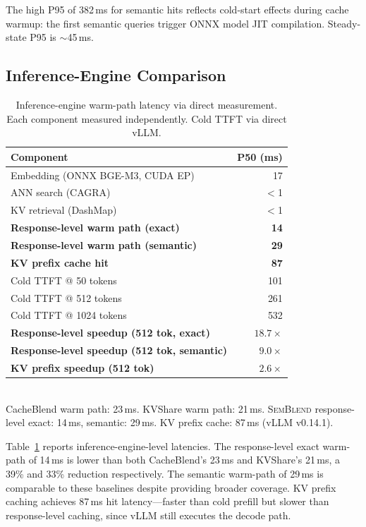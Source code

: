 \documentclass[11pt,twocolumn]{article}
\newcommand{\semblend}{\textsc{SemBlend}\xspace}
\begin{document}
The high P95 of 382\,ms for semantic hits reflects cold-start effects
during cache warmup: the first semantic queries trigger ONNX model JIT
compilation. Steady-state P95 is ${\sim}$45\,ms.


\subsection{Inference-Engine Comparison}
\label{sec:inference-comparison}

\begin{table}[t]
\centering
\caption{Inference-engine warm-path latency via direct measurement.
Each component measured independently. Cold TTFT via direct vLLM.}
\label{tab:microbench}
\footnotesize
\setlength{\tabcolsep}{3pt}
\begin{tabular}{@{}lr@{}}
\toprule
\textbf{Component} & \textbf{P50 (ms)} \\
\midrule
Embedding (ONNX BGE-M3, CUDA EP) & 17 \\
ANN search (CAGRA) & $<$1 \\
KV retrieval (DashMap) & $<$1 \\
\midrule
\textbf{Response-level warm path (exact)} & \textbf{14} \\
\textbf{Response-level warm path (semantic)} & \textbf{29} \\
\textbf{KV prefix cache hit} & \textbf{87} \\
\midrule
Cold TTFT @ 50 tokens  & 101 \\
Cold TTFT @ 512 tokens & 261 \\
Cold TTFT @ 1024 tokens & 532 \\
\midrule
\textbf{Response-level speedup (512 tok, exact)} & $\mathbf{18.7\times}$ \\
\textbf{Response-level speedup (512 tok, semantic)} & $\mathbf{9.0\times}$ \\
\textbf{KV prefix speedup (512 tok)} & $\mathbf{2.6\times}$ \\
\bottomrule
\end{tabular}\\[2pt]
{\footnotesize CacheBlend warm path: 23\,ms. KVShare warm path: 21\,ms.
\semblend response-level exact: 14\,ms, semantic: 29\,ms.
KV prefix cache: 87\,ms (vLLM v0.14.1).}
\end{table}

Table~\ref{tab:microbench} reports inference-engine-level latencies.
The response-level exact warm-path of 14\,ms is lower than both
CacheBlend's 23\,ms and KVShare's 21\,ms, a 39\% and 33\% reduction
respectively. The semantic warm-path of 29\,ms is comparable to these
baselines despite providing broader coverage. KV prefix caching
achieves 87\,ms hit latency---faster than cold prefill but slower
than response-level caching, since vLLM still executes the decode path.
\end{document}
